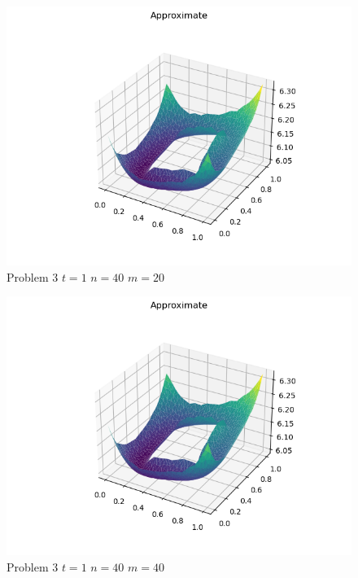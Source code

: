 \documentclass{report}
\begin{document}
\begin{figure}[h]
	\caption{Problem 3 $t = 1$ $n = 40$ $m = 20$}
	\includegraphics[width=\textwidth]{example.png}
\end{figure}
\begin{figure}[h]
	\caption{Problem 3 $t = 1$ $n = 40$ $m = 40$}
	\includegraphics[width=\textwidth]{example.png}
\end{figure}
\end{document}
